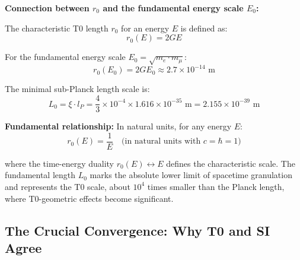 \documentclass[12pt,a4paper]{article}
\begin{document}
	\begin{insight}
		\textbf{Connection between $r_0$ and the fundamental energy scale $E_0$:}
		
		The characteristic T0 length $r_0$ for an energy $E$ is defined as:
		\begin{equation}
			r_0(E) = 2GE
		\end{equation}
		
		For the fundamental energy scale $E_0 = \sqrt{m_e \cdot m_\mu}$:
		\begin{equation}
			r_0(E_0) = 2GE_0 \approx 2.7 \times 10^{-14} \text{ m}
		\end{equation}
		
		The minimal sub-Planck length scale is:
		\begin{equation}
			\boxed{L_0 = \xi \cdot l_P = \frac{4}{3} \times 10^{-4} \times 1.616 \times 10^{-35} \text{ m} = 2.155 \times 10^{-39} \text{ m}}
		\end{equation}
		
		\textbf{Fundamental relationship:} In natural units, for any energy $E$:
		\begin{equation}
			r_0(E) = \frac{1}{E} \quad \text{(in natural units with } c = \hbar = 1\text{)}
		\end{equation}
		
		where the time-energy duality $r_0(E) \leftrightarrow E$ defines the characteristic scale. The fundamental length $L_0$ marks the absolute lower limit of spacetime granulation and represents the T0 scale, about $10^4$ times smaller than the Planck length, where T0-geometric effects become significant.
	\end{insight}
	
	\subsection{The Crucial Convergence: Why T0 and SI Agree}
	
\end{document}
